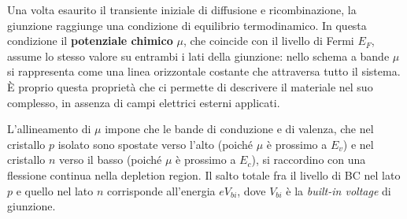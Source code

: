 Una volta esaurito il transiente iniziale di diffusione e ricombinazione, la giunzione raggiunge una condizione di equilibrio termodinamico. In questa condizione il \textbf{potenziale chimico} \( \mu \), che coincide con il livello di Fermi \( E_F \), assume lo stesso valore su entrambi i lati della giunzione: nello schema a bande \( \mu \) si rappresenta come una linea orizzontale costante che attraversa tutto il sistema. È proprio questa proprietà che ci permette di descrivere il materiale nel suo complesso, in assenza di campi elettrici esterni applicati.

L'allineamento di \( \mu \) impone che le bande di conduzione e di valenza, che nel cristallo \( p \) isolato sono spostate verso l'alto (poiché \( \mu \) è prossimo a \( E_v \)) e nel cristallo \( n \) verso il basso (poiché \( \mu \) è prossimo a \( E_c \)), si raccordino con una flessione continua nella depletion region. Il salto totale fra il livello di BC nel lato \( p \) e quello nel lato \( n \) corrisponde all'energia \( e V_{bi} \), dove \( V_{bi} \) è la \emph{built-in voltage} di giunzione.

